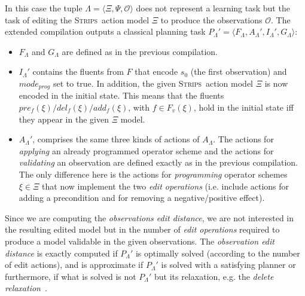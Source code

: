 \documentclass{article}
\newcommand{\tup}[1]{{\langle #1 \rangle}}
\newcommand{\strips}{\textsc{Strips}}     %
\begin{document}
In this case the tuple $\Lambda=\tup{\Xi,\Psi,\mathcal{O}}$ does not represent a learning task but the task of editing the \strips\ action model $\Xi$ to produce the observations $\mathcal{O}$. The extended compilation outputs a classical planning task $P_{\Lambda}'=\tup{F_{\Lambda},A_{\Lambda}',I_{\Lambda}',G_{\Lambda}}$:
\begin{itemize}
\item $F_{\Lambda}$ and $G_{\Lambda}$ are defined as in the previous compilation.
\item $I_{\Lambda}'$ contains the fluents from $F$ that encode $s_0$ (the first observation) and $mode_{prog}$ set to true. In addition, the given \strips\ action model $\Xi$ is now encoded in the initial state. This means that the fluents $pre_f(\xi)/del_f(\xi)/add_f(\xi)$, with $f\in F_v(\xi)$, hold in the initial state iff they appear in the given $\Xi$ model.
\item $A_{\Lambda}'$, comprises the same three kinds of actions of $A_{\Lambda}$. The actions for {\em applying} an already programmed operator scheme and the actions for {\em validating} an observation are defined exactly as in the previous compilation. The only difference here is the actions for {\em programming} operator schemes $\xi\in\Xi$ that now implement the two {\em edit operations} (i.e. include actions for adding a precondition and for removing a negative/positive effect).
\end{itemize}

Since we are computing the {\em observations edit distance}, we are not interested in the resulting edited model but in the number of {\em edit operations} required to produce a model validable in the given observations. The {\em observation edit distance} is exactly computed if $P_{\Lambda}'$ is optimally solved (according to the number of edit actions), and is approximate if $P_{\Lambda}'$ is solved with a satisfying planner or furthermore, if what is solved is not $P_{\Lambda}'$ but its relaxation, e.g. the {\em delete relaxation}~\cite{bonet2001planning}.
\end{document}
